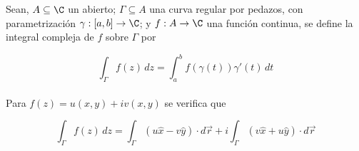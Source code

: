 Sean, $A\subseteq\C$ un abierto; $\Gamma\subseteq A$ una curva regular por pedazos, con parametrización $\gamma: [a, b]\to\C$; y $f:A\to\C$ una función continua, se define la integral compleja de $f$ sobre $\Gamma$ por

\[\int_\Gamma f(z)\,dz = \int^b_a f(\gamma(t))\gamma'(t)\,dt\]\\

Para $f(z) = u(x,y) + iv(x,y)$ se verifica que

\[\int_\Gamma f(z)\,dz = \int_\Gamma (u\hat{x}-v\hat{y})\cdot d\Vec{r}+i\int_\Gamma (v\hat{x}+u\hat{y})\cdot d\Vec{r}\]

\newpage